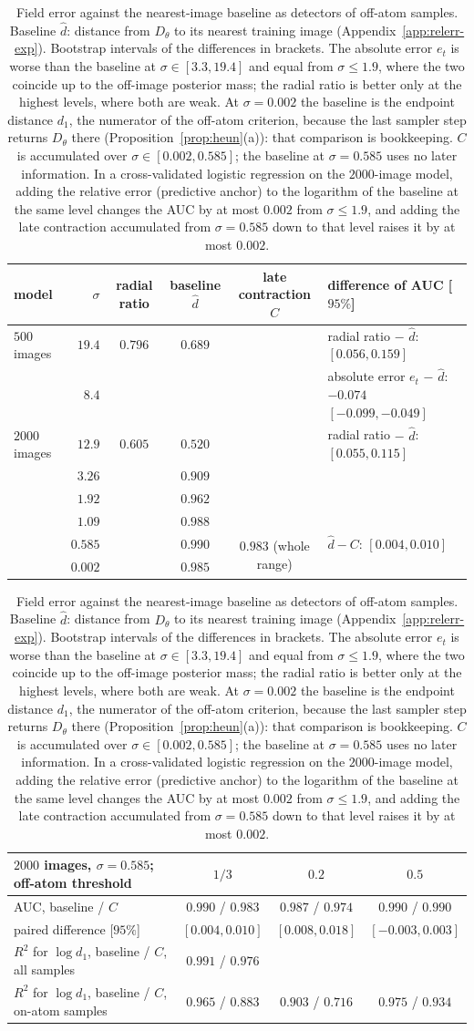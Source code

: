\documentclass{article} %
\theoremstyle{plain}
\theoremstyle{definition}
\theoremstyle{remark}
\begin{document}
\begin{table}[t]
\centering\footnotesize\setlength{\tabcolsep}{4pt}
\begin{tabular}{@{}lr cccl@{}}
\toprule
model & $\sigma$ & radial ratio & baseline $\hat d$ & late contraction $C$ & difference of AUC [$95\%$]\\
\midrule
$500$ images & $19.4$ & $0.796$ & $0.689$ & & radial ratio $-$ $\hat d$: $[0.056,0.159]$\\
& $8.4$ & & & & absolute error $e_t$ $-$ $\hat d$: $-0.074$ $[-0.099,-0.049]$\\
\midrule
$2000$ images & $12.9$ & $0.605$ & $0.520$ & & radial ratio $-$ $\hat d$: $[0.055,0.115]$\\
& $3.26$ & & $0.909$ & &\\
& $1.92$ & & $0.962$ & &\\
& $1.09$ & & $0.988$ & &\\
& $0.585$ & & $0.990$ & \multirow{2}{*}{$0.983$ (whole range)} & $\hat d-C$: $[0.004,0.010]$\\
& $0.002$ & & $0.985$ & &\\
\bottomrule
\end{tabular}

\vspace{4pt}
\begin{tabular}{@{}l ccc@{}}
\toprule
$2000$ images, $\sigma=0.585$; off-atom threshold & $1/3$ & $0.2$ & $0.5$\\
\midrule
AUC, baseline / $C$ & $0.990$ / $0.983$ & $0.987$ / $0.974$ & $0.990$ / $0.990$\\
\quad paired difference [$95\%$] & $[0.004,0.010]$ & $[0.008,0.018]$ & $[-0.003,0.003]$\\
$R^2$ for $\log d_1$, baseline / $C$, all samples & $0.991$ / $0.976$ & & \\
$R^2$ for $\log d_1$, baseline / $C$, on-atom samples & $0.965$ / $0.883$ & $0.903$ / $0.716$ & $0.975$ / $0.934$\\
\bottomrule
\end{tabular}
\caption{Field error against the nearest-image baseline as detectors of off-atom samples. Baseline
$\hat d$: distance from $D_\theta$ to its nearest training image (Appendix~\ref{app:relerr-exp}).
Bootstrap intervals of the differences in brackets. The absolute error $e_t$ is worse than the
baseline at $\sigma\in[3.3,19.4]$ and equal from $\sigma\le1.9$, where the two coincide up to the
off-image posterior mass; the radial ratio is better only at the highest levels, where both are
weak. At $\sigma=0.002$ the baseline is the endpoint distance $d_1$, the numerator of the off-atom
criterion, because the last sampler step returns $D_\theta$ there (Proposition~\ref{prop:heun}(a)):
that comparison is bookkeeping. $C$ is accumulated over $\sigma\in[0.002,0.585]$; the baseline at
$\sigma=0.585$ uses no later information. In a cross-validated logistic regression on the
$2000$-image model, adding the relative error (predictive anchor) to the logarithm of the baseline at
the same level changes the AUC by at most $0.002$ from $\sigma\le1.9$, and adding the late
contraction accumulated from $\sigma=0.585$ down to that level raises it by at most $0.002$.}
\label{tab:auc}
\end{table}
\end{document}
